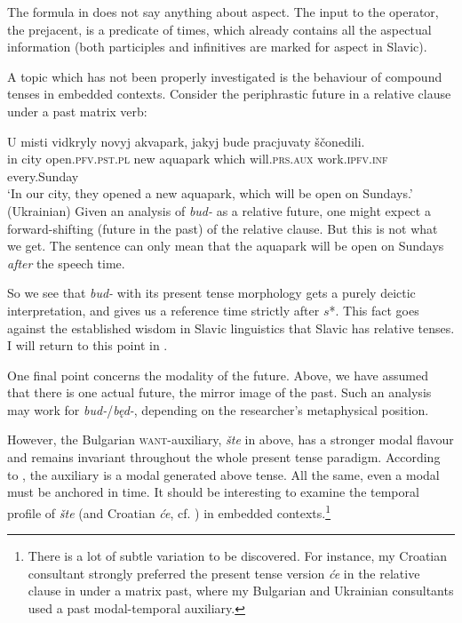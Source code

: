 \documentclass[output=paper,colorlinks,citecolor=brown]{langscibook}
\begin{document}
 The formula in  does not say anything about aspect. The input to the operator, the prejacent, is a predicate of times, which already contains all the aspectual information (both participles and infinitives are marked for aspect in Slavic).

 A topic which has not been properly investigated is the behaviour of compound tenses in embedded contexts. Consider the periphrastic future in a  relative clause under a past matrix verb:

 \ea\label{akvapark}\gll
U misti vidkryly novyj akvapark, jakyj bude pracjuvaty  ščonedili.\\
in city open.\textsc{pfv}.\textsc{pst.pl} new aquapark which will.\textsc{prs}.\textsc{aux} work.\textsc{ipfv}.\textsc{inf} every.Sunday \\
\glt `In our city, they opened a new aquapark, which will be open on Sundays.'\\\hfill (Ukrainian)
\z
 Given an analysis of \textit{bud-} as a relative future, one might expect 
a forward-shifting (future in the past) of the relative clause. But this is not what we get. The sentence can only mean that the aquapark will be open on Sundays \textit{after} the speech time.

So we see that \textit{bud-} with its present tense morphology gets a purely deictic interpretation, and gives us a reference time strictly after $s$*. This fact goes against the established wisdom in Slavic linguistics that Slavic has  relative tenses. I will return to this point in .

One final point concerns the modality of the future. Above, we have assumed that there is one actual future, the mirror image of the past. Such an analysis may work for {\textit{bud-}}/\textit{b{ę}d-}, depending on the researcher's metaphysical position. 

However, the Bulgarian \textsc{want}-auxiliary, \textit{šte} in  above,
has a stronger modal flavour  
and remains invariant
throughout the 
whole present tense paradigm.
According to \citet[102]{Migdalski2006}, the auxiliary is a modal generated above tense.
All the same, even a modal must be anchored in time. It should be interesting to examine the temporal profile of \textit{šte} (and Croatian \textit{će}, cf. ) in embedded contexts.\footnote{There is a lot of subtle variation to be discovered. For instance, my Croatian consultant strongly preferred the present tense version \textit{će} in the relative clause in   under a matrix past, where my Bulgarian and Ukrainian consultants used a past modal-temporal auxiliary.}
\end{document}
